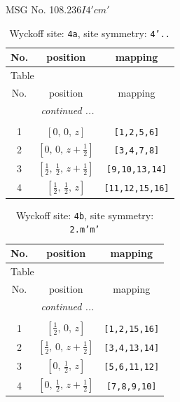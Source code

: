 \documentclass[fleqn,8pt]{jsarticle}
\begin{document}
\setcounter{MaxMatrixCols}{32}

\renewcommand{\tablename}{Table~}
\renewcommand{\figurename}{Figure~}
\begin{center}
\LARGE
MSG No. 108.236\quad$I4'cm'$
\end{center}
\renewcommand{\arraystretch}{1.2}
\begin{longtable}{ccc}
\caption{Wyckoff site: {\tt 4a}, site symmetry: {\tt 4'..}}
 \\
 \hline \hline
No. & position & mapping \\ \hline \endfirsthead

\multicolumn{2}{l}{\tablename\ \thetable{}} \\
 \hline \hline
No. & position & mapping \\ \hline \endhead

 \hline \hline
\multicolumn{2}{r}{\footnotesize\it continued ...} \\ \endfoot

 \hline \hline
\multicolumn{2}{r}{} \\ \endlastfoot

1 & $\left[ 0,\, 0,\, z \right]$ & {\tt [1,2,5,6]} \\ \hline
2 & $\left[ 0,\, 0,\, z + \frac{1}{2} \right]$ & {\tt [3,4,7,8]} \\ \hline
3 & $\left[ \frac{1}{2},\, \frac{1}{2},\, z + \frac{1}{2} \right]$ & {\tt [9,10,13,14]} \\ \hline
4 & $\left[ \frac{1}{2},\, \frac{1}{2},\, z \right]$ & {\tt [11,12,15,16]} \\
\end{longtable}
\renewcommand{\arraystretch}{1.2}
\begin{longtable}{ccc}
\caption{Wyckoff site: {\tt 4b}, site symmetry: {\tt 2.m'm'}}
 \\
 \hline \hline
No. & position & mapping \\ \hline \endfirsthead

\multicolumn{2}{l}{\tablename\ \thetable{}} \\
 \hline \hline
No. & position & mapping \\ \hline \endhead

 \hline \hline
\multicolumn{2}{r}{\footnotesize\it continued ...} \\ \endfoot

 \hline \hline
\multicolumn{2}{r}{} \\ \endlastfoot

1 & $\left[ \frac{1}{2},\, 0,\, z \right]$ & {\tt [1,2,15,16]} \\ \hline
2 & $\left[ \frac{1}{2},\, 0,\, z + \frac{1}{2} \right]$ & {\tt [3,4,13,14]} \\ \hline
3 & $\left[ 0,\, \frac{1}{2},\, z \right]$ & {\tt [5,6,11,12]} \\ \hline
4 & $\left[ 0,\, \frac{1}{2},\, z + \frac{1}{2} \right]$ & {\tt [7,8,9,10]} \\
\end{longtable}
\end{document}
